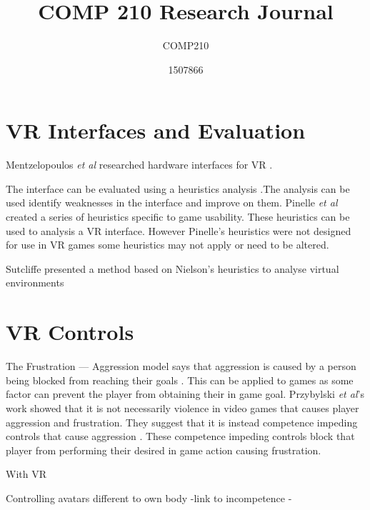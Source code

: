 \documentclass{scrartcl}
\title{COMP 210 Research Journal}
\subtitle{COMP210}
\author{1507866}
\begin{document}
	
\maketitle
	
\abstract{}
	
\section{VR Interfaces and Evaluation}
Mentzelopoulos \textit{et al} researched hardware interfaces for VR \cite{Mentzelopoulos}.

The interface can be evaluated using a heuristics analysis \cite{Nielsen, Pinelle}.The analysis can be used identify weaknesses in the interface and improve on them. Pinelle \textit{et al} created a series of heuristics specific to game usability. These heuristics can be used to analysis a VR interface. However Pinelle's heuristics were not designed for use in VR games some heuristics may not apply or need to be altered.

Sutcliffe presented a method based on Nielson's heuristics to analyse virtual environments
\cite{sutcliffe2004heuristic}


\cite{stanney}

\section{VR Controls}
The Frustration --- Aggression model says that aggression is caused by a person being blocked from reaching their goals \cite{dollard1939frustration}.  This can be applied to games as some factor can prevent the player from obtaining their in game goal.  Przybylski \textit{et al}'s work showed that it is not necessarily violence in video games that causes player aggression and frustration. They suggest that it is instead competence impeding controls that cause aggression \cite{przybylski, przybylski2010motivational}. These competence impeding controls block that player from performing their desired in game action causing frustration. 

With VR 


Controlling avatars different to own body 
-link to incompetence 
-
\cite{won2015homuncular}

	


	
\end{document}
